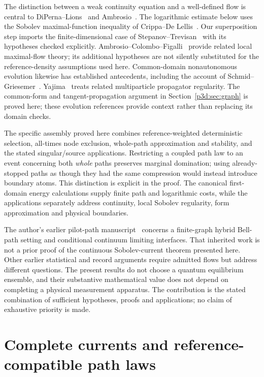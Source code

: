 \documentclass[11pt]{article}
\numberwithin{equation}{section}
\theoremstyle{definition}
\theoremstyle{remark}
\begin{document}
The distinction between a weak continuity equation and a well-defined flow is central to DiPerna--Lions~\cite{DiPernaLions1989} and Ambrosio~\cite{Ambrosio2004}. The logarithmic estimate below uses the Sobolev maximal-function inequality of Crippa--De Lellis~\cite{CDLflow}. Our superposition step imports the finite-dimensional case of Stepanov--Trevisan~\cite{STsuperposition} with its hypotheses checked explicitly. Ambrosio--Colombo--Figalli~\cite{ACFmaximal} provide related local maximal-flow theory; its additional hypotheses are not silently substituted for the reference-density assumptions used here. Common-domain nonautonomous evolution likewise has established antecedents, including the account of Schmid--Griesemer~\cite{SchmidGriesemer2014}. Yajima~\cite{Yajima2016} treats related multiparticle propagator regularity. The common-form and tangent-propagation argument in Section~\ref{p3d:sec:graph} is proved here; these evolution references provide context rather than replacing its domain checks.

The specific assembly proved here combines reference-weighted deterministic selection, all-times node exclusion, whole-path approximation and stability, and the stated singular/source applications. Restricting a coupled path law to an event concerning both \emph{whole} paths preserves marginal domination; using already-stopped paths as though they had the same compression would instead introduce boundary atoms. This distinction is explicit in the proof. The canonical first-domain energy calculations supply finite path and logarithmic costs, while the applications separately address continuity, local Sobolev regularity, form approximation and physical boundaries.

The author's earlier pilot-path manuscript~\cite{RodgersPilot2026} concerns a finite-graph hybrid Bell-path setting and conditional continuum limiting interfaces. That inherited work is not a prior proof of the continuous Sobolev-current theorem presented here. Other earlier statistical and record arguments require admitted flows but address different questions. The present results do not choose a quantum equilibrium ensemble, and their substantive mathematical value does not depend on completing a physical measurement apparatus. The contribution is the stated combination of sufficient hypotheses, proofs and applications; no claim of exhaustive priority is made.


\section{Complete currents and reference-compatible path laws}
\label{p3f:sec:setup}
\end{document}
